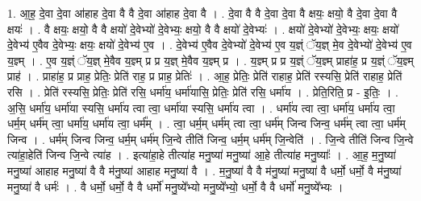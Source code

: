 \documentclass[17pt]{extarticle}
\begin{document}
1. आ॒ह॒ दे॒वा दे॒वा आ॑हाह दे॒वा वै वै दे॒वा आ॑हाह दे॒वा वै । . दे॒वा वै वै दे॒वा दे॒वा वै क्षयः॒ क्षयो॒ वै दे॒वा दे॒वा वै क्षयः॑ । . वै क्षयः॒ क्षयो॒ वै वै क्षयो॑ दे॒वेभ्यो॑ दे॒वेभ्यः॒ क्षयो॒ वै वै क्षयो॑ दे॒वेभ्यः॑ । . क्षयो॑ दे॒वेभ्यो॑ दे॒वेभ्यः॒ क्षयः॒ क्षयो॑ दे॒वेभ्य॑ ए॒वैव दे॒वेभ्यः॒ क्षयः॒ क्षयो॑ दे॒वेभ्य॑ ए॒व । . दे॒वेभ्य॑ ए॒वैव दे॒वेभ्यो॑ दे॒वेभ्य॑ ए॒व य॒ज्ञ्ं ॅय॒ज्ञ् मे॒व दे॒वेभ्यो॑ दे॒वेभ्य॑ ए॒व य॒ज्ञ्म् । . ए॒व य॒ज्ञ्ं ॅय॒ज्ञ् मे॒वैव य॒ज्ञ्म् प्र प्र य॒ज्ञ् मे॒वैव य॒ज्ञ्म् प्र । . य॒ज्ञ्म् प्र प्र य॒ज्ञ्ं ॅय॒ज्ञ्म् प्राहा॑ह॒ प्र य॒ज्ञ्ं ॅय॒ज्ञ्म् प्राह॑ । . प्राहा॑ह॒ प्र प्राह॒ प्रेतिः॒ प्रेति॑ राह॒ प्र प्राह॒ प्रेतिः॑ । . आ॒ह॒ प्रेतिः॒ प्रेति॑ राहाह॒ प्रेति॑ रस्यसि॒ प्रेति॑ राहाह॒ प्रेति॑ रसि । . प्रेति॑ रस्यसि॒ प्रेतिः॒ प्रेति॑ रसि॒ धर्मा॑य॒ धर्मा॑यासि॒ प्रेतिः॒ प्रेति॑ रसि॒ धर्मा॑य । . प्रेति॒रिति॒ प्र - इ॒तिः॒ । . अ॒सि॒ धर्मा॑य॒ धर्मा॑या स्यसि॒ धर्मा॑य त्वा त्वा॒ धर्मा॑या स्यसि॒ धर्मा॑य त्वा । . धर्मा॑य त्वा त्वा॒ धर्मा॑य॒ धर्मा॑य त्वा॒ धर्म॒म् धर्म॑म् त्वा॒ धर्मा॑य॒ धर्मा॑य त्वा॒ धर्म᳚म् । . त्वा॒ धर्म॒म् धर्म॑म् त्वा त्वा॒ धर्म॑म् जिन्व जिन्व॒ धर्म॑म् त्वा त्वा॒ धर्म॑म् जिन्व । . धर्म॑म् जिन्व जिन्व॒ धर्म॒म् धर्म॑म् जि॒न्वे तीति॑ जिन्व॒ धर्म॒म् धर्म॑म् जि॒न्वेति॑ । . जि॒न्वे तीति॑ जिन्व जि॒न्वे त्या॑हा॒हेति॑ जिन्व जि॒न्वे त्या॑ह । . इत्या॑हा॒हे तीत्या॑ह मनु॒ष्या॑ मनु॒ष्या॑ आ॒हे तीत्या॑ह मनु॒ष्याः᳚ । . आ॒ह॒ म॒नु॒ष्या॑ मनु॒ष्या॑ आहाह मनु॒ष्या॑ वै वै म॑नु॒ष्या॑ आहाह मनु॒ष्या॑ वै । . म॒नु॒ष्या॑ वै वै म॑नु॒ष्या॑ मनु॒ष्या॑ वै धर्मो॒ धर्मो॒ वै म॑नु॒ष्या॑ मनु॒ष्या॑ वै धर्मः॑ । . वै धर्मो॒ धर्मो॒ वै वै धर्मो॑ मनु॒ष्ये᳚भ्यो मनु॒ष्ये᳚भ्यो॒ धर्मो॒ वै वै धर्मो॑ मनु॒ष्ये᳚भ्यः । \newline
\end{document}
